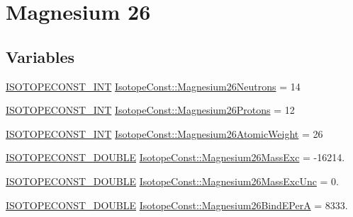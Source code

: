 \hypertarget{group___isotope_const-_magnesium-_mg26}{}\section{Magnesium 26}
\label{group___isotope_const-_magnesium-_mg26}
\subsection*{Variables}
\begin{DoxyCompactItemize}
\item 
\mbox{\hyperlink{group___isotope_const-_macros_ga5f18360b3e99483a35c32d789e62621c}{I\+S\+O\+T\+O\+P\+E\+C\+O\+N\+S\+T\+\_\+\+I\+NT}} \mbox{\hyperlink{group___isotope_const-_magnesium-_mg26_gab4fbe88d020088316b85bb2e207a9707}{Isotope\+Const\+::\+Magnesium26\+Neutrons}} = 14
\item 
\mbox{\hyperlink{group___isotope_const-_macros_ga5f18360b3e99483a35c32d789e62621c}{I\+S\+O\+T\+O\+P\+E\+C\+O\+N\+S\+T\+\_\+\+I\+NT}} \mbox{\hyperlink{group___isotope_const-_magnesium-_mg26_ga07b6c7dda14bfa336002253f4b91d8c2}{Isotope\+Const\+::\+Magnesium26\+Protons}} = 12
\item 
\mbox{\hyperlink{group___isotope_const-_macros_ga5f18360b3e99483a35c32d789e62621c}{I\+S\+O\+T\+O\+P\+E\+C\+O\+N\+S\+T\+\_\+\+I\+NT}} \mbox{\hyperlink{group___isotope_const-_magnesium-_mg26_gaef234e5c0b918a791f6c4e9d01f3ad5b}{Isotope\+Const\+::\+Magnesium26\+Atomic\+Weight}} = 26
\item 
\mbox{\hyperlink{group___isotope_const-_macros_ga8f45a7272ce02c0b4c65c44636ed719a}{I\+S\+O\+T\+O\+P\+E\+C\+O\+N\+S\+T\+\_\+\+D\+O\+U\+B\+LE}} \mbox{\hyperlink{group___isotope_const-_magnesium-_mg26_ga0372178cd54e989a34bb844d7fca6755}{Isotope\+Const\+::\+Magnesium26\+Mass\+Exc}} = -\/16214.
\item 
\mbox{\hyperlink{group___isotope_const-_macros_ga8f45a7272ce02c0b4c65c44636ed719a}{I\+S\+O\+T\+O\+P\+E\+C\+O\+N\+S\+T\+\_\+\+D\+O\+U\+B\+LE}} \mbox{\hyperlink{group___isotope_const-_magnesium-_mg26_ga2e005abe824b950981cd54717242c986}{Isotope\+Const\+::\+Magnesium26\+Mass\+Exc\+Unc}} = 0.
\item 
\mbox{\hyperlink{group___isotope_const-_macros_ga8f45a7272ce02c0b4c65c44636ed719a}{I\+S\+O\+T\+O\+P\+E\+C\+O\+N\+S\+T\+\_\+\+D\+O\+U\+B\+LE}} \mbox{\hyperlink{group___isotope_const-_magnesium-_mg26_ga9dde77ec6e7117a64c34c2db06a5e88b}{Isotope\+Const\+::\+Magnesium26\+Bind\+E\+PerA}} = 8333.
\item 

\end{DoxyCompactItemize}
